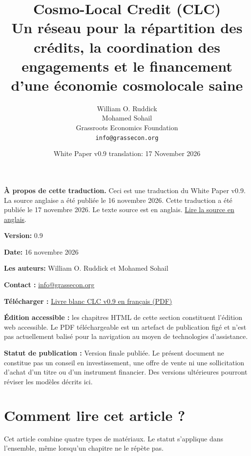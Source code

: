 \documentclass[11pt]{article}
\title{Cosmo-Local Credit (CLC)\\Un réseau pour la répartition des crédits, la coordination des engagements et le financement d'une économie cosmolocale saine}
\author{William O. Ruddick \\ Mohamed Sohail \\ Grassroots Economics Foundation \\ \texttt{info@grassecon.org}}
\date{White Paper v0.9 translation: 17 November 2026}
\begin{document}
\maketitle
\tableofcontents
\newpage
\sloppy
\RaggedRight

\textbf{À propos de cette traduction.} Ceci est une traduction du White Paper v0.9. La source anglaise a été publiée le 16 novembre 2026. Cette traduction a été publiée le 17 novembre 2026. Le texte source est en anglais. \href{https://docs.cosmolocal.credit/white-paper}{Lire la source en anglais}.

\textbf{Version:} 0.9

\textbf{Date:} 16 novembre 2026

\textbf{Les auteurs:} William O. Ruddick et Mohamed Sohail

\textbf{Contact :} \href{mailto:info@grassecon.org}{info@grassecon.org}

\textbf{Télécharger :} \href{https://docs.cosmolocal.credit/white-paper/Cosmo-Local-Credit-CLC-White-Paper-v9-fr.pdf}{Livre blanc CLC v0.9 en français (PDF)}

\textbf{Édition accessible :} les chapitres HTML de cette section constituent l'édition web accessible. Le PDF téléchargeable est un artefact de publication figé et n'est pas actuellement balisé pour la navigation au moyen de technologies d'assistance.

\textbf{Statut de publication :} Version finale publiée. Le présent document ne constitue pas un conseil en investissement, une offre de vente ni une sollicitation d'achat d'un titre ou d'un instrument financier. Des versions ultérieures pourront réviser les modèles décrits ici.

\section*{Comment lire cet article ?}

Cet article combine quatre types de matériaux. Le statut s'applique dans l'ensemble, même lorsqu'un chapitre ne le répète pas.
\end{document}
